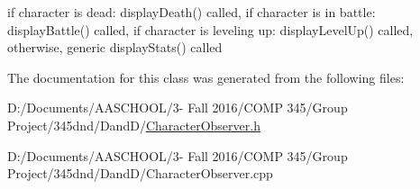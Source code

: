 if character is dead\+: display\+Death() called, if character is in battle\+: display\+Battle() called, if character is leveling up\+: display\+Level\+Up() called, otherwise, generic display\+Stats() called 

The documentation for this class was generated from the following files\+:\begin{DoxyCompactItemize}
\item 
D\+:/\+Documents/\+A\+A\+S\+C\+H\+O\+O\+L/3-\/ Fall 2016/\+C\+O\+M\+P 345/\+Group Project/345dnd/\+Dand\+D/\hyperlink{_character_observer_8h}{Character\+Observer.\+h}\item 
D\+:/\+Documents/\+A\+A\+S\+C\+H\+O\+O\+L/3-\/ Fall 2016/\+C\+O\+M\+P 345/\+Group Project/345dnd/\+Dand\+D/Character\+Observer.\+cpp\end{DoxyCompactItemize}
